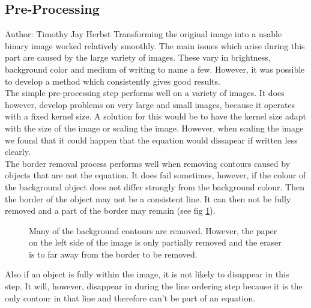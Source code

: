\documentclass[12pt]{article}
\begin{document}
	\subsection{Pre-Processing}
	\small{Author: Timothy Jay Herbst} \newline \newline
	Transforming the original image into a usable binary image worked relatively smoothly.
	The main issues which arise during this part are caused by the large variety of images.
	These vary in brightness, background color and medium of writing to name a few.
	However, it was possible to develop a method which consistently gives good results.\\
	The simple pre-processing step performs well on a variety of images.
	It does however, develop problems on very large and small images, because it operates with a fixed kernel size.
	A solution for this would be to have the kernel size adapt with the size of the image or scaling the image.
	However, when scaling the image we found that it could happen that the equation would dissapear if written less clearly.\\
	The border removal process performs well when removing contours caused by objects that are not the equation.
	It does fail sometimes, however, if the colour of the background object does not differ strongly from the background colour.
	Then the border of the object may not be a consistent line.
	It can then not be fully removed and a part of the border may remain (see fig \ref{fig:PartialBorder}).
	\begin{figure}[htp]
		\centering
		\quad%
		
		\caption{Many of the background contours are removed.
		However, the paper on the left side of the image is only partially removed and the eraser is to far away from the border to be removed.}
		\label{fig:PartialBorder}
	\end{figure}
	Also if an object is fully within the image, it is not likely to disappear in this step.
	It will, however, disappear in during the line ordering step because it is the only contour in that line and therefore can't be part of an equation.\\
	
\end{document}

